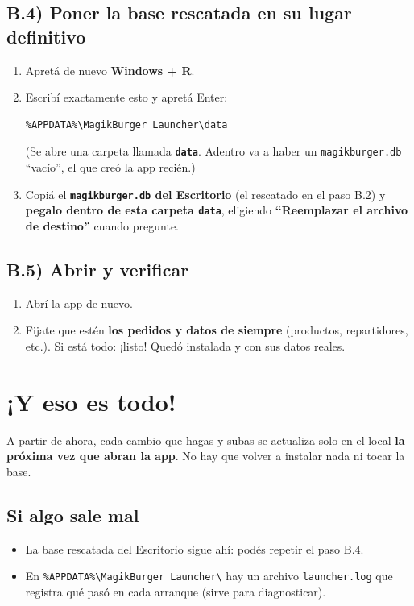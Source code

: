 \documentclass[11pt,a4paper]{article}
\newcommand{\rut}[1]{\texttt{#1}}
\newcommand{\bs}{\textbackslash{}}
\begin{document}
\subsection*{B.4) Poner la base rescatada en su lugar definitivo}
\begin{enumerate}
  \item Apretá de nuevo \textbf{Windows + R}.
  \item Escribí exactamente esto y apretá Enter:
\begin{lstlisting}
%APPDATA%\MagikBurger Launcher\data
\end{lstlisting}
        (Se abre una carpeta llamada \textbf{\rut{data}}. Adentro va a haber un
        \rut{magikburger.db} ``vacío'', el que creó la app recién.)
  \item Copiá el \textbf{\rut{magikburger.db} del Escritorio} (el rescatado en el paso B.2) y
        \textbf{pegalo dentro de esta carpeta \rut{data}}, eligiendo
        \textbf{``Reemplazar el archivo de destino''} cuando pregunte.
\end{enumerate}

\subsection*{B.5) Abrir y verificar}
\begin{enumerate}
  \item Abrí la app de nuevo.
  \item Fijate que estén \textbf{los pedidos y datos de siempre} (productos, repartidores, etc.).
        Si está todo: ¡listo! Quedó instalada y con sus datos reales.
\end{enumerate}

\section*{¡Y eso es todo!}

A partir de ahora, cada cambio que hagas y subas se actualiza solo en el local
\textbf{la próxima vez que abran la app}. No hay que volver a instalar nada ni tocar la base.

\subsection*{Si algo sale mal}
\begin{itemize}[leftmargin=1.4em]
  \item La base rescatada del Escritorio sigue ahí: podés repetir el paso B.4.
  \item En \rut{\%APPDATA\%\bs MagikBurger Launcher\bs} hay un archivo \rut{launcher.log}
        que registra qué pasó en cada arranque (sirve para diagnosticar).
\end{itemize}
\end{document}
